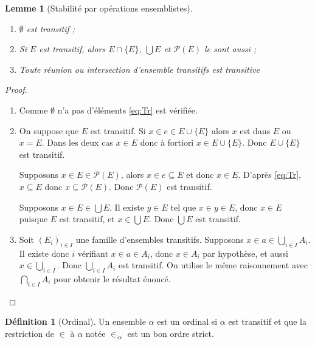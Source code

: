 \documentclass{article}
\theoremstyle{definition}
\newtheorem{definition}[subsubsection]{Définition}
\theoremstyle{plain}
\theoremstyle{plain}
\theoremstyle{plain}
\newtheorem{lemma}[subsubsection]{Lemme}
\theoremstyle{plain}
\theoremstyle{plain}
\begin{document}
\begin{lemma}[Stabilité par opérations ensemblistes]
	\begin{enumerate}[label = (\roman*)]
		\item \( \emptyset \) est transitif ;
		\item Si \( E \) est transitif, alors \( E \cap \{E\} \), \( \bigcup E \) et \( \mathcal{P}(E) \) le sont aussi ;
		\item Toute réunion ou intersection d'ensemble transitifs est transitive
	\end{enumerate}
\end{lemma}

\begin{proof}
	\begin{enumerate}[label = (\roman*)]
		\item Comme \( \emptyset \) n'a pas d'éléments \eqref{eq:Tr} est vérifiée.
		\item On suppose que \( E \) est transitif. Si \( x \in e \in E \cup \{E\} \) alors \( x \) est dans \( E \) ou \( x = E \). Dans les deux cas \( x \in E \) donc à fortiori \( x \in E \cup \{E\} \). Donc \( E \cup \{E\} \) est transitif.

			Supposons \( x \in E \in \mathcal{P}(E) \), alors \( x \in e \subseteq E \) et donc \( x \in E \). D'après \eqref{eq:Tr}, \( x \subseteq E \) donc \( x \subseteq \mathcal{P}(E)\). Donc \( \mathcal{P}(E) \) est transitif.

			Supposons \( x \in E \in \bigcup E \). Il existe \( y \in E \) tel que \( x \in y \in E \), donc \( x \in E \) puisque \( E \) est transitif, et \( x \in \bigcup E \). Donc \( \bigcup E \) est transitif.
		\item Soit \( (E_{i})_{i \in I} \) une famille d'ensembles transitifs. Supposons \( x \in a \in \bigcup_{i\in I} A_{i} \). Il existe donc \( i \) vérifiant \( x \in a \in A_{i} \), donc \( x \in A_{i} \) par hypothèse, et aussi \( x \in \bigcup_{i \in I}\). Donc \( \bigcup_{i \in I} A_{i} \) est transitif. On utilise le même raisonnement avec \( \bigcap_{i \in I} A_{i} \) pour obtenir le résultat énoncé.
	\end{enumerate}
\end{proof}

\begin{definition}[Ordinal]
	Un ensemble \( \alpha \) est un ordinal si \( \alpha \) est transitif et que la restriction de \( \in  \) à \( \alpha \) notée \( \in_{|\alpha} \) est un bon ordre strict.
\end{definition}
\end{document}
